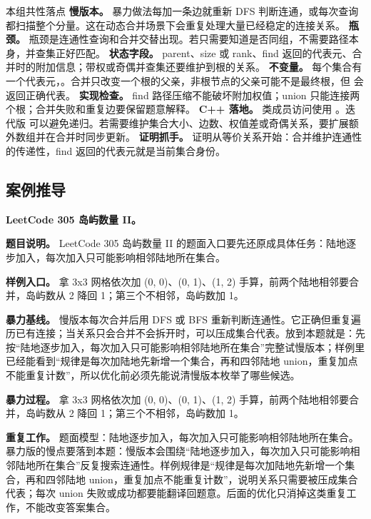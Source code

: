 \begin{principlebox}{本组共性落点}
\textbf{慢版本。} 暴力做法每加一条边就重新 DFS 判断连通，或每次查询都扫描整个分量。这在动态合并场景下会重复处理大量已经稳定的连接关系。
\textbf{瓶颈。} 瓶颈是连通性查询和合并交替出现。若只需要知道是否同组，不需要路径本身，并查集正好匹配。
\textbf{状态字段。} parent、size 或 rank、find 返回的代表元、合并时的附加信息；带权或奇偶并查集还要维护到根的关系。
\textbf{不变量。} 每个集合有一个代表元，。合并只改变一个根的父亲，非根节点的父亲可能不是最终根，但  会返回正确代表。
\textbf{实现检查。} find 路径压缩不能破坏附加权值；union 只能连接两个根；合并失败和重复边要保留题意解释。
\textbf{C++ 落地。} 类成员访问使用 。迭代版  可以避免递归。若需要维护集合大小、边数、权值差或奇偶关系，要扩展额外数组并在合并时同步更新。
\textbf{证明抓手。} 证明从等价关系开始：合并维护连通性的传递性，find 返回的代表元就是当前集合身份。
\end{principlebox}

\subsection{案例推导}

\noindent\textbf{LeetCode 305 岛屿数量 II。}

\textbf{题目说明。} LeetCode 305 岛屿数量 II 的题面入口要先还原成具体任务：陆地逐步加入，每次加入只可能影响相邻陆地所在集合。

\textbf{样例入口。} 拿 3x3 网格依次加 (0, 0)、(0, 1)、(1, 2) 手算，前两个陆地相邻要合并，岛屿数从 2 降回 1；第三个不相邻，岛屿数加 1。

\textbf{暴力基线。} 慢版本每次合并后用 DFS 或 BFS 重新判断连通性。它正确但重复遍历已有连接；当关系只会合并不会拆开时，可以压成集合代表。放到本题就是：先按“陆地逐步加入，每次加入只可能影响相邻陆地所在集合”完整试慢版本；样例里已经能看到“规律是每次加陆地先新增一个集合，再和四邻陆地 union，重复加点不能重复计数”，所以优化前必须先能说清慢版本枚举了哪些候选。

\textbf{暴力过程。} 拿 3x3 网格依次加 (0, 0)、(0, 1)、(1, 2) 手算，前两个陆地相邻要合并，岛屿数从 2 降回 1；第三个不相邻，岛屿数加 1。

\textbf{重复工作。} 题面模型：陆地逐步加入，每次加入只可能影响相邻陆地所在集合。暴力版的慢点要落到本题：慢版本会围绕“陆地逐步加入，每次加入只可能影响相邻陆地所在集合”反复搜索连通性。样例规律是“规律是每次加陆地先新增一个集合，再和四邻陆地 union，重复加点不能重复计数”，说明关系只需要被压成集合代表；每次 union 失败或成功都要能翻译回题意。后面的优化只消掉这类重复工作，不能改变答案集合。

